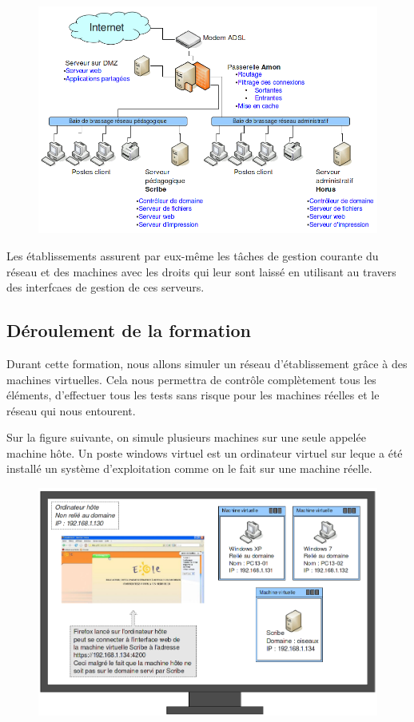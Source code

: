 \documentclass{article}
\makeatletter
\def\maxwidth{\ifdim\Gin@nat@width>\linewidth\linewidth
\else\Gin@nat@width\fi}
\let\Oldincludegraphics\includegraphics
\renewcommand{\includegraphics}[1]{\Oldincludegraphics[width=\maxwidth]{#1}}
\makeatother
\begin{document}
\begin{figure}[htbp]
\centering
\includegraphics{scribe_html_2149feac.png}
\caption{\label{2149feac}}
\end{figure}

Les établissements assurent par eux-même les tâches de gestion courante
du réseau et des machines avec les droits qui leur sont laissé en
utilisant au travers des interfcaes de gestion de ces serveurs.

\subsection{Déroulement de la formation}

Durant cette formation, nous allons simuler un réseau d'établissement
grâce à des machines virtuelles. Cela nous permettra de contrôle
complètement tous les éléments, d'effectuer tous les tests sans risque
pour les machines réelles et le réseau qui nous entourent.

Sur la figure suivante, on simule plusieurs machines sur une seule
appelée machine hôte. Un poste windows virtuel est un ordinateur virtuel
sur leque a été installé un système d'exploitation comme on le fait sur
une machine réelle.

\begin{figure}[htbp]
\centering
\includegraphics{scribe_html_413f4ff1.png}
\caption{\label{413f4ff1}}
\end{figure}
\end{document}
